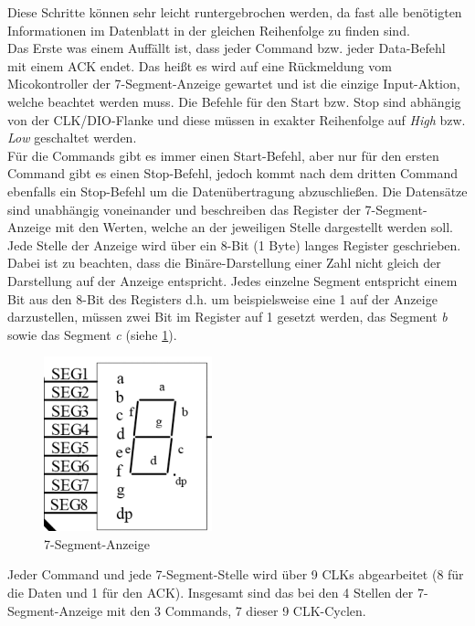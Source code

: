 \documentclass[11pt,a4paper,titlepage]{article}
\begin{document}
Diese Schritte können sehr leicht runtergebrochen werden,
da fast alle benötigten Informationen im Datenblatt in der gleichen Reihenfolge zu finden sind.\\
Das Erste was einem Auffällt ist, dass jeder Command bzw. jeder Data-Befehl mit einem ACK endet.
Das heißt es wird auf eine Rückmeldung vom Micokontroller der 7-Segment-Anzeige gewartet und ist die einzige Input-Aktion,
welche beachtet werden muss.
Die Befehle für den Start bzw. Stop sind abhängig von der CLK/DIO-Flanke
und diese müssen in exakter Reihenfolge auf \textit{High} bzw. \textit{Low} geschaltet werden.\\
Für die Commands gibt es immer einen Start-Befehl, aber nur für den ersten Command gibt es einen Stop-Befehl,
jedoch kommt nach dem dritten Command ebenfalls ein Stop-Befehl um die Datenübertragung abzuschließen.
Die Datensätze sind unabhängig voneinander und beschreiben das Register der 7-Segment-Anzeige mit den Werten,
welche an der jeweiligen Stelle dargestellt werden soll.
Jede Stelle der Anzeige wird über ein 8-Bit (1 Byte) langes Register geschrieben.
Dabei ist zu beachten, dass die Binäre-Darstellung einer Zahl nicht gleich der Darstellung auf der Anzeige entspricht.
Jedes einzelne Segment entspricht einem Bit aus den 8-Bit des Registers d.h. um beispielsweise eine 1 auf der Anzeige darzustellen,
müssen zwei Bit im Register auf 1 gesetzt werden, das Segment \textit{b} sowie das Segment \textit{c} (siehe \cref{7sa}).

\vspace{1cm}
\begin{figure}[h]
    \begin{center}
        \includegraphics[scale=0.8]{Bilder/7-Segment-Display.png}
        \caption{7-Segment-Anzeige}
        \label{7sa}
    \end{center}
\end{figure}


\newpage

Jeder Command und jede 7-Segment-Stelle wird über 9 CLKs abgearbeitet (8 für die Daten und 1 für den ACK).
Insgesamt sind das bei den 4 Stellen der 7-Segment-Anzeige mit den 3 Commands, 7 dieser 9 CLK-Cyclen.
\end{document}
